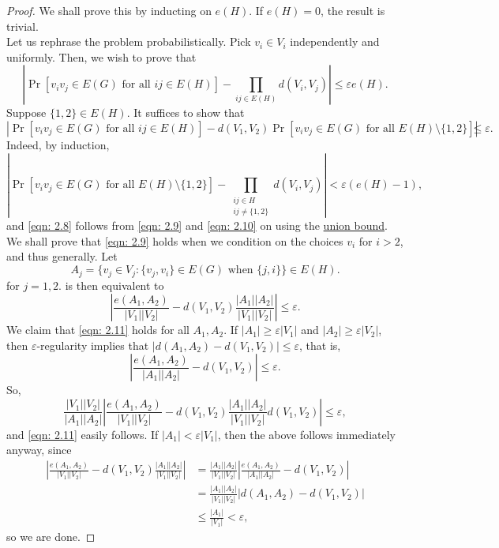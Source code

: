 			\begin{proof}
				We shall prove this by inducting on $e(H)$. If $e(H)=0$, the result is trivial.\\
				Let us rephrase the problem probabilistically. Pick $v_i\in V_i$ independently and uniformly. Then, we wish to prove that
				\begin{equation}
					\label{eqn: 2.8}
					\left|\Pr\left[ v_iv_j\in E(G) \text{ for all } ij\in E(H) \right] - \prod_{ij\in E(H)} d(V_i,V_j)\right| \le \varepsilon e(H).
				\end{equation}
				Suppose $\{1,2\}\in E(H)$. It suffices to show that
				\begin{equation}
					\label{eqn: 2.9}
					\left| \Pr\left[ v_iv_j \in E(G) \text{ for all }ij\in E(H) \right] - d(V_1,V_2) \Pr\left[ v_iv_j\in E(G) \text{ for all }E(H)\setminus\{1,2\} \right] \right| \le \varepsilon.
				\end{equation}
				Indeed, by induction,
				\begin{equation}
					\label{eqn: 2.10}
					\left| \Pr\left[ v_iv_j\in E(G) \text{ for all }E(H)\setminus\{1,2\} \right] - \prod_{\substack{ij\in H \\ ij\neq\{1,2\}}} d(V_i,V_j) \right| < \varepsilon(e(H) - 1),
				\end{equation}
				and \eqref{eqn: 2.8} follows from \eqref{eqn: 2.9} and \eqref{eqn: 2.10} on using the \href{https://en.wikipedia.org/wiki/Boole%27s_inequality}{union bound}. We shall prove that \eqref{eqn: 2.9} holds when we condition on the choices $v_i$ for $i>2$, and thus generally. Let
				\[ A_j = \{ v_j \in V_j : \{v_j,v_i\} \in E(G) \text{ when } \{j,i\} \}\in E(H). \]
				for $j = 1,2$.  is then equivalent to
				\begin{equation}
					\label{eqn: 2.11}
					\left| \frac{e(A_1,A_2)}{|V_1||V_2|} - d(V_1,V_2) \frac{|A_1||A_2|}{|V_1||V_2|} \right| \le \varepsilon.
				\end{equation}
				We claim that \eqref{eqn: 2.11} holds for all $A_1,A_2$. If $|A_1| \ge \varepsilon|V_1|$ and $|A_2|\ge\varepsilon|V_2|$, then $\varepsilon$-regularity implies that $|d(A_1,A_2) - d(V_1,V_2)| \le \varepsilon$, that is,
				\[ \left| \frac{e(A_1,A_2)}{|A_1||A_2|} - d(V_1,V_2) \right| \le \varepsilon. \]
				So,
				\[ \frac{|V_1||V_2|}{|A_1||A_2|} \left| \frac{e(A_1,A_2)}{|V_1||V_2|} - d(V_1,V_2) \frac{|A_1||A_2|}{|V_1||V_2|} d(V_1,V_2) \right| \le \varepsilon, \]
				and \eqref{eqn: 2.11} easily follows. If $|A_1| < \varepsilon|V_1|$, then the above follows immediately anyway, since
				\begin{align*}
					\left| \frac{e(A_1,A_2)}{|V_1||V_2|} - d(V_1,V_2) \frac{|A_1||A_2|}{|V_1||V_2|} \right| &= \frac{|A_1||A_2|}{|V_1||V_2|} \left| \frac{e(A_1,A_2)}{|A_1||A_2|} - d(V_1,V_2) \right| \\
					&= \frac{|A_1||A_2|}{|V_1||V_2|} \left| d(A_1,A_2) - d(V_1,V_2) \right| \\
					&\le \frac{|A_1|}{|V_1|} < \varepsilon,
				\end{align*}
				so we are done.
			\end{proof}


